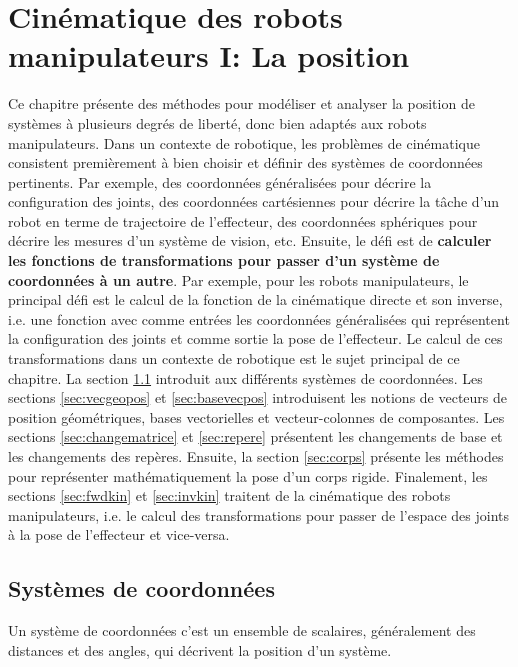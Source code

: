 \chapter{Cinématique des robots manipulateurs I: La position}
\label{sec:cine1}

Ce chapitre présente des méthodes pour modéliser et analyser la position de systèmes à plusieurs degrés de liberté, donc bien adaptés aux robots manipulateurs. Dans un contexte de robotique, les problèmes de cinématique consistent premièrement à bien choisir et définir des systèmes de coordonnées pertinents. Par exemple, des coordonnées généralisées pour décrire la configuration des joints, des coordonnées cartésiennes pour décrire la tâche d'un robot en terme de trajectoire de l'effecteur, des coordonnées sphériques pour décrire les mesures d'un système de vision, etc. Ensuite, le défi est de \textbf{calculer les fonctions de transformations pour passer d'un système de coordonnées à un autre}. Par exemple, pour les robots manipulateurs, le principal défi est le calcul de la fonction de la cinématique directe et son inverse, i.e. une fonction avec comme entrées les coordonnées généralisées qui représentent la configuration des joints et comme sortie la pose de l'effecteur. Le calcul de ces transformations dans un contexte de robotique est le sujet principal de ce chapitre. La section \ref{sec:syscoord} introduit aux différents systèmes de coordonnées. Les sections \ref{sec:vecgeopos} et \ref{sec:basevecpos} introduisent les notions de vecteurs de position géométriques, bases vectorielles et vecteur-colonnes de composantes. Les sections \ref{sec:changematrice} et \ref{sec:repere} présentent les changements de base et les changements des repères. Ensuite, la section \ref{sec:corps} présente les méthodes pour représenter mathématiquement la pose d'un corps rigide. Finalement, les sections \ref{sec:fwdkin} et \ref{sec:invkin} traitent de la cinématique des robots manipulateurs, i.e. le calcul des transformations pour passer de l'espace des joints à la pose de l'effecteur et vice-versa. 





\section{Systèmes de coordonnées}
\label{sec:syscoord}

Un système de coordonnées c'est un ensemble de scalaires, généralement des distances et des angles, qui décrivent la position d'un système. 


